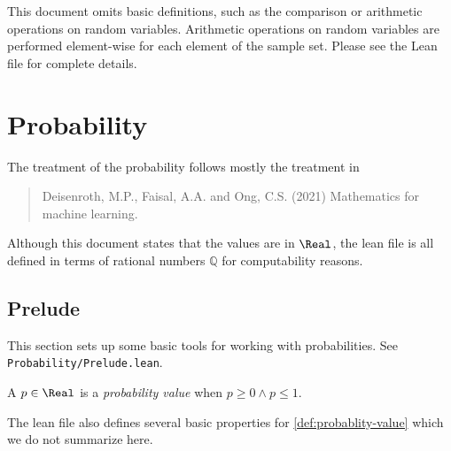 %
\newcommand{\id}{\operatorname{id}}


\begin{remark}
This document omits basic definitions, such as the comparison or arithmetic operations on random variables. Arithmetic operations on random variables are performed element-wise for each element of the sample set. Please see the Lean file for complete details.
\end{remark}


\section{Probability}

The treatment of the probability follows mostly the treatment in
\begin{quote}
  Deisenroth, M.P., Faisal, A.A. and Ong, C.S. (2021) Mathematics for machine learning.
\end{quote}

Although this document states that the values are in $\Real$, the lean file is all defined in terms of rational numbers $\mathbb{Q}$ for computability reasons. 

\subsection{Prelude}

This section sets up some basic tools for working with probabilities. See \texttt{Probability/Prelude.lean}.

\begin{definition} \label{def:probablity-value}
A $p\in \Real$ is a \emph{probability value} when $p \ge 0 \wedge p \le 1$.
\leanok
\end{definition}

The lean file also defines several basic properties for \cref{def:probablity-value} which we do not summarize here.

